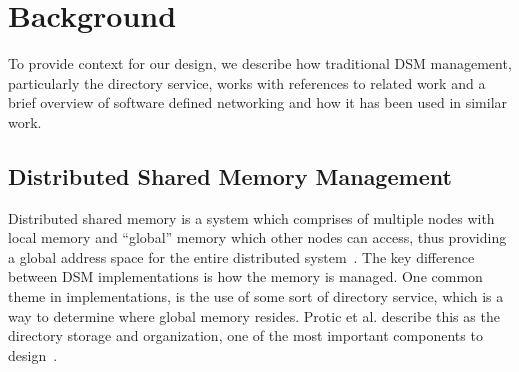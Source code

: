 \section{Background}
\label{sec:background}
To provide context for our design, we describe how traditional DSM management, particularly the directory service, works with references to related work and a brief overview of software defined networking and how it has been used in similar work. 
\subsection{Distributed Shared Memory Management}
Distributed shared memory is a system which comprises of multiple nodes with local memory and ``global'' memory which other nodes can access, thus providing a global address space for the entire distributed system~\cite{treadmarks, Protic1996, Nitzberg1991}. The key difference between DSM implementations is how the memory is managed. One common theme in implementations, is the use of some sort of directory service, which is a way to determine where global memory resides. Protic et al. describe this as the directory storage and organization, one of the most important components to design~\cite{Protic1996}. 

